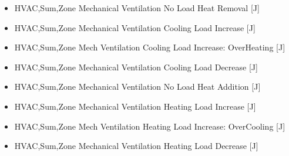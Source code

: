\begin{itemize}
\tightlist
\item
  HVAC,Sum,Zone Mechanical Ventilation No Load Heat Removal {[}J{]}
\item
  HVAC,Sum,Zone Mechanical Ventilation Cooling Load Increase {[}J{]}
\item
  HVAC,Sum,Zone Mech Ventilation Cooling Load Increase: OverHeating {[}J{]}
\item
  HVAC,Sum,Zone Mechanical Ventilation Cooling Load Decrease {[}J{]}
\item
  HVAC,Sum,Zone Mechanical Ventilation No Load Heat Addition {[}J{]}
\item
  HVAC,Sum,Zone Mechanical Ventilation Heating Load Increase {[}J{]}
\item
  HVAC,Sum,Zone Mech Ventilation Heating Load Increase: OverCooling {[}J{]}
\item
  HVAC,Sum,Zone Mechanical Ventilation Heating Load Decrease {[}J{]}
\end{itemize}
